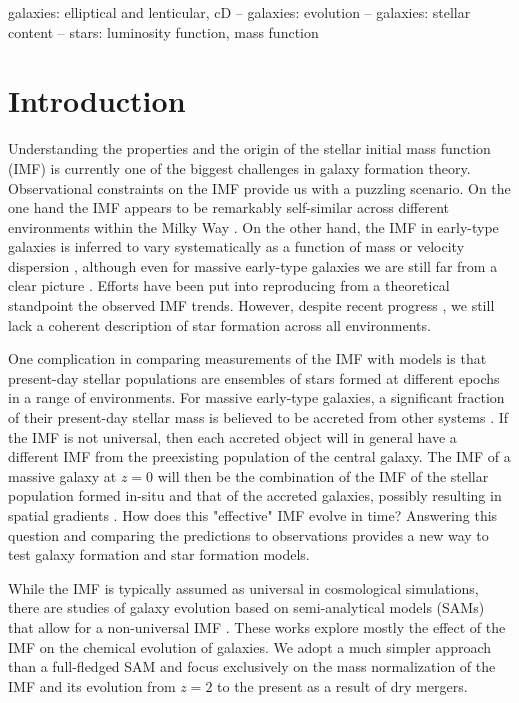 \documentclass[usenatbib]{mnras}
\begin{document}
\begin{keywords}
   galaxies: elliptical and lenticular, cD -- galaxies: evolution -- galaxies: stellar content -- stars: luminosity function, mass function
\end{keywords}

\section{Introduction}\label{sect:intro}

Understanding the properties and the origin of the stellar
  initial mass function (IMF) is currently one of the biggest
  challenges in galaxy formation theory.  Observational constraints
on the IMF provide us with a puzzling scenario. On the one hand the
IMF appears to be remarkably self-similar across different
environments within the Milky Way \citep[see e.g.][]{BCM10, Off15}. On
the other hand, the IMF in early-type galaxies is inferred to vary
systematically as a function of mass or velocity dispersion
\citep{Tre++10,Cap++12,CvD12, Dut++12, TRN13, Spi++14, Pos++15},
although even for massive early-type galaxies we are still far from a
clear picture \citep{SLC15}.  Efforts have been put into reproducing
from a theoretical standpoint the observed IMF trends. However,
despite recent progress \citep{H+C11,Kru11,Hop12,GKH16}, we still lack a coherent description of
star formation across all environments.

One complication in comparing measurements of the IMF with models is
that present-day stellar populations are ensembles of stars formed at
different epochs in a range of environments.  For massive early-type
galaxies, a significant fraction of their present-day stellar mass is
believed to be accreted from other systems \citep[e.g.][]{vDo++10}.
If the IMF is not universal, then each accreted object will in general
have a different IMF from the preexisting population of the central
galaxy.  The IMF of a massive galaxy at $z=0$ will then be the
combination of the IMF of the stellar population formed in-situ and
that of the accreted galaxies, possibly resulting in spatial gradients
\citep{Mar++15, LaB++16}.  How does this "effective" IMF evolve in
time?  Answering this question and comparing the predictions to
observations provides a new way to test galaxy formation and star
formation models.

While the IMF is typically assumed as universal in cosmological
simulations, there are studies of galaxy evolution based on
semi-analytical models (SAMs) that allow for a non-universal IMF
\citep{Nag++05, Bek13, Cha++15, GargiuloI++15, Fon++16}. These works
explore mostly the effect of the IMF on the chemical evolution of
galaxies.  We adopt a much simpler approach than a full-fledged SAM
and focus exclusively on the mass normalization of the IMF and its
evolution from $z=2$ to the present as a result of dry mergers.
\end{document}

